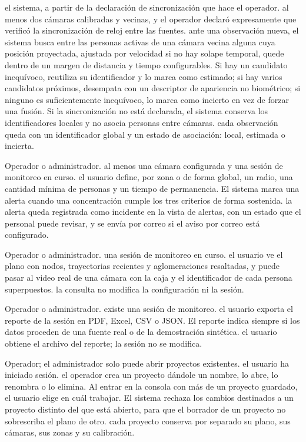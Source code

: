   {el sistema, a partir de la declaración de sincronización que hace el
   operador.}
  {al menos dos cámaras calibradas y vecinas, y el operador declaró
   expresamente que verificó la sincronización de reloj entre las fuentes.}
  {ante una observación nueva, el sistema busca entre las personas activas
   de una cámara vecina alguna cuya posición proyectada, ajustada por
   velocidad si no hay solape temporal, quede dentro de un margen de
   distancia y tiempo configurables. Si hay un candidato inequívoco,
   reutiliza su identificador y lo marca como estimado; si hay varios
   candidatos próximos, desempata con un descriptor de apariencia no
   biométrico; si ninguno es suficientemente inequívoco, lo marca como
   incierto en vez de forzar una fusión. Si la sincronización no está
   declarada, el sistema conserva los identificadores locales y no asocia
   personas entre cámaras.}
  {cada observación queda con un identificador global y un estado de
   asociación: local, estimada o incierta.}

  {Operador o administrador.}
  {al menos una cámara configurada y una sesión de monitoreo en curso.}
  {el usuario define, por zona o de forma global, un radio, una cantidad
   mínima de personas y un tiempo de permanencia. El sistema marca una
   alerta cuando una concentración cumple los tres criterios de forma
   sostenida.}
  {la alerta queda registrada como incidente en la vista de alertas, con
   un estado que el personal puede revisar, y se envía por correo si el
   aviso por correo está configurado.}

  {Operador o administrador.}
  {una sesión de monitoreo en curso.}
  {el usuario ve el plano con nodos, trayectorias recientes y
   aglomeraciones resaltadas, y puede pasar al video real de una cámara con
   la caja y el identificador de cada persona superpuestos.}
  {la consulta no modifica la configuración ni la sesión.}

  {Operador o administrador.}
  {existe una sesión de monitoreo.}
  {el usuario exporta el reporte de la sesión en PDF, Excel, CSV o JSON.
   El reporte indica siempre si los datos proceden de una fuente real o de
   la demostración sintética.}
  {el usuario obtiene el archivo del reporte; la sesión no se modifica.}

  {Operador; el administrador solo puede abrir proyectos existentes.}
  {el usuario ha iniciado sesión.}
  {el operador crea un proyecto dándole un nombre, lo abre, lo renombra o
   lo elimina. Al entrar en la consola con más de un proyecto guardado, el
   usuario elige en cuál trabajar. El sistema rechaza los cambios
   destinados a un proyecto distinto del que está abierto, para que el
   borrador de un proyecto no sobrescriba el plano de otro.}
  {cada proyecto conserva por separado su plano, sus cámaras, sus zonas y
   su calibración.}

